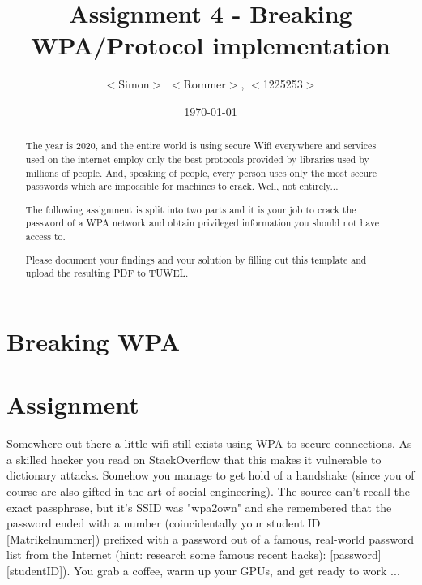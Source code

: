 \documentclass{scrartcl}
\title{Assignment 4 - Breaking WPA/Protocol implementation}
\author{$<$Simon$>$ $<$Rommer$>$, $<$1225253$>$}
\date\today{}
\begin{document}
\maketitle

\begin{abstract}
	
The year is 2020, and the entire world is using secure Wifi everywhere and
services used on the internet employ only the best protocols provided by
libraries used by millions of people. And, speaking of people, every person
uses only the most secure passwords which are impossible for machines to
crack. Well, not entirely...

The following assignment is split into two parts and it is your job to crack
the password of a WPA network and obtain privileged information you should not
have access to.

Please document your findings and your solution by filling out this template
and upload the resulting PDF to TUWEL.
\end{abstract}



\section{Breaking WPA}

\section*{Assignment}
Somewhere out there a little wifi still exists using WPA to secure connections.
As a skilled hacker you read on StackOverflow that this makes it vulnerable to
dictionary attacks. Somehow you manage to get hold of a handshake (since you of
course are also gifted in the art of social engineering). The source can't
recall the exact passphrase, but it's SSID was "wpa2own" and she remembered
that the password ended with a number (coincidentally your student ID
[Matrikelnummer]) prefixed with a password out of a famous, real-world password
list from the Internet (hint: research some famous recent hacks): [password][studentID]). You grab a coffee, warm up your
GPUs, and get ready to work ... 
\end{document}
